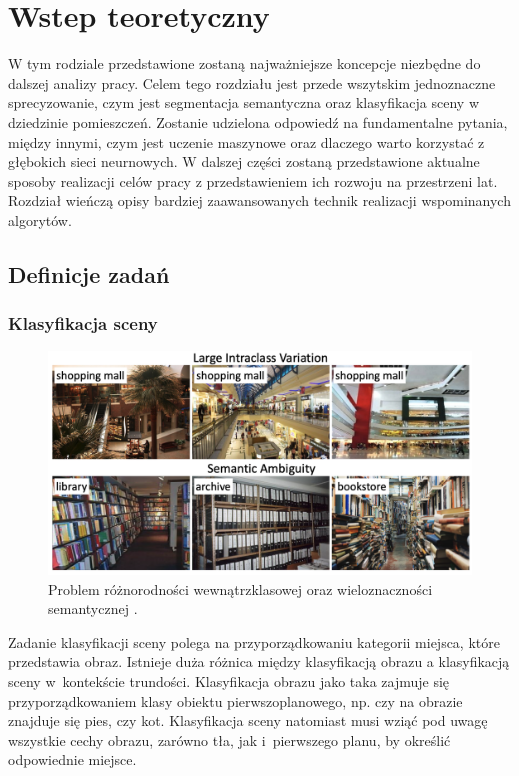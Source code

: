 \newpage %
\section{Wstep teoretyczny}
W tym rodziale przedstawione zostaną najważniejsze koncepcje niezbędne do dalszej analizy pracy. Celem tego rozdziału jest przede wszytskim jednoznaczne sprecyzowanie, czym jest segmentacja semantyczna oraz klasyfikacja sceny w dziedzinie pomieszczeń. Zostanie udzielona odpowiedź na fundamentalne pytania, między innymi, czym jest uczenie maszynowe oraz dlaczego warto korzystać z głębokich sieci neurnowych. W dalszej części zostaną przedstawione aktualne sposoby realizacji celów pracy z przedstawieniem ich rozwoju na przestrzeni lat. Rozdział wieńczą opisy bardziej zaawansowanych technik realizacji wspominanych algorytów.
\subsection{Definicje zadań}
\subsubsection{Klasyfikacja sceny}
\begin{figure}[ht!]
    \includegraphics[width=\textwidth]{img/scene_class.png}
    \caption{Problem różnorodności wewnątrzklasowej oraz wieloznaczności semantycznej \cite{zeng2021deep}.}
    \label{fig:scene-class}
\end{figure}

Zadanie klasyfikacji sceny polega na przyporządkowaniu kategorii miejsca, które przedstawia obraz. Istnieje duża różnica między klasyfikacją obrazu a klasyfikacją sceny w~kontekście trundości. Klasyfikacja obrazu jako taka zajmuje się przyporządkowaniem klasy obiektu pierwszoplanowego, np. czy na obrazie znajduje się pies, czy kot. Klasyfikacja sceny natomiast musi wziąć pod uwagę wszystkie cechy obrazu, zarówno tła, jak i~pierwszego planu, by określić odpowiednie miejsce. 

